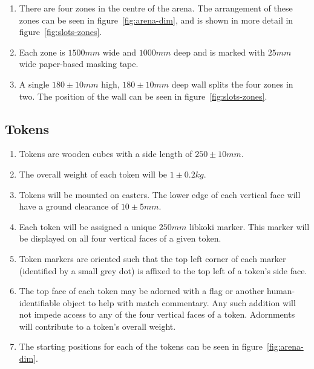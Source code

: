 \begin{enumerate}
\item There are four zones in the centre of the arena.
      The arrangement of these zones can be seen in figure~\ref{fig:arena-dim}, and is shown in more detail in figure~\ref{fig:slots-zones}.

\item Each zone is $1500mm$ wide and $1000mm$ deep and is  marked with $25mm$ wide paper-based masking tape.

\item A single $180 \pm 10mm$ high, $180 \pm 10mm$ deep wall splits the four zones in two.
      The position of the wall can be seen in figure~\ref{fig:slots-zones}.
\end{enumerate}

\subsection{Tokens}
\label{sub:Tokens}
\begin{enumerate}
\item Tokens are wooden cubes with a side length of $250 \pm 10 mm$.

\item The overall weight of each token will be $1 \pm 0.2 kg$.

\item Tokens will be mounted on casters.
      The lower edge of each vertical face will have a ground clearance of $10 \pm 5 mm$.

\item Each token will be assigned a unique $250mm$ libkoki marker.
      This marker will be displayed on all four vertical faces of a given token.

\item Token markers are oriented such that the top left corner of each marker (identified by a small grey dot) is affixed to the top left of a token's side face.

\item The top face of each token may be adorned with a flag or another human-identifiable object to help with match commentary.
      Any such addition will not impede access to any of the four vertical faces of a token.
      Adornments will contribute to a token's overall weight.

\item The starting positions for each of the tokens can be seen in figure~\ref{fig:arena-dim}.

\end{enumerate}

\clearpage
